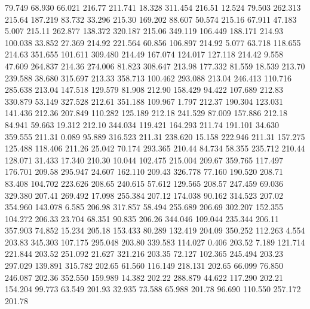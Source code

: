   79.749   68.930   66.021       216.77
 211.741   18.328  311.454       216.51
  12.524   79.503  262.313       215.64
 187.219   83.732   33.296       215.30
 169.202   88.607   50.574       215.16
  67.911   47.183    5.007       215.11
 262.877  138.372  320.187       215.06
 349.119  106.449  188.171       214.93
 100.038   33.852   27.369       214.92
 221.564   60.856  106.897       214.92
   5.077   63.718  118.655       214.63
 351.655  101.611  309.480       214.49
 167.074  124.017  127.118       214.42
   9.558   47.609  264.837       214.36
 274.006   81.823  308.647       213.98
 177.332   81.559   18.539       213.70
 239.588   38.680  315.697       213.33
 358.713  100.462  293.088       213.04
 246.413  110.716  285.638       213.04
 147.518  129.579   81.908       212.90
 158.429   94.422  107.689       212.83
 330.879   53.149  327.528       212.61
 351.188  109.967    1.797       212.37
 190.304  123.031  141.436       212.36
 207.849  110.282  125.189       212.18
 241.529   87.009  157.886       212.18
  84.941   59.663   19.312       212.10
 344.034  119.421  164.293       211.74
 191.101   34.630  359.555       211.31
   0.089   95.889  316.523       211.31
 238.620   15.158  222.946       211.31
 157.275  125.488  118.406       211.26
  25.042   70.174  293.365       210.44
  84.734   58.355  235.712       210.44
 128.071   31.433   17.340       210.30
  10.044  102.475  215.004       209.67
 359.765  117.497  176.701       209.58
 295.947   24.607  162.110       209.43
 326.778   77.160  190.520       208.71
  83.408  104.702  223.626       208.65
 240.615   57.612  129.565       208.57
 247.459   69.036  329.380       207.41
 269.492   17.098  255.384       207.12
 174.038   90.162  314.523       207.02
 354.960  143.078    6.585       206.98
 317.857   58.494  255.689       206.69
 302.207  152.355  104.272       206.33
  23.704   68.351   90.835       206.26
 344.046  109.044  235.344       206.11
 357.903   74.852   15.234       205.18
 153.433   80.289  132.419       204.09
 350.252  112.263    4.554       203.83
 345.303  107.175  295.048       203.80
 339.583  114.027    0.406       203.52
   7.189  121.714  221.844       203.52
 251.092   21.627  321.216       203.35
  72.127  102.365  245.494       203.23
 297.029  139.891  315.782       202.65
  61.560  116.149  218.131       202.65
  66.099   76.850  246.087       202.36
 352.550  159.989   14.382       202.22
 288.879   44.622  117.290       202.21
 154.204   99.773   63.549       201.93
  32.935   73.588   65.988       201.78
  96.690  110.550  257.172       201.78
